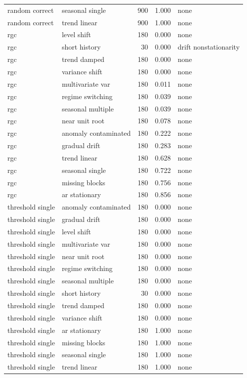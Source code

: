 \begin{tabular}{llrrl}
random correct & seasonal single & 900 & 1.000 & none \\
random correct & trend linear & 900 & 1.000 & none \\
rgc & level shift & 180 & 0.000 & none \\
rgc & short history & 30 & 0.000 & drift nonstationarity \\
rgc & trend damped & 180 & 0.000 & none \\
rgc & variance shift & 180 & 0.000 & none \\
rgc & multivariate var & 180 & 0.011 & none \\
rgc & regime switching & 180 & 0.039 & none \\
rgc & seasonal multiple & 180 & 0.039 & none \\
rgc & near unit root & 180 & 0.078 & none \\
rgc & anomaly contaminated & 180 & 0.222 & none \\
rgc & gradual drift & 180 & 0.283 & none \\
rgc & trend linear & 180 & 0.628 & none \\
rgc & seasonal single & 180 & 0.722 & none \\
rgc & missing blocks & 180 & 0.756 & none \\
rgc & ar stationary & 180 & 0.856 & none \\
threshold single & anomaly contaminated & 180 & 0.000 & none \\
threshold single & gradual drift & 180 & 0.000 & none \\
threshold single & level shift & 180 & 0.000 & none \\
threshold single & multivariate var & 180 & 0.000 & none \\
threshold single & near unit root & 180 & 0.000 & none \\
threshold single & regime switching & 180 & 0.000 & none \\
threshold single & seasonal multiple & 180 & 0.000 & none \\
threshold single & short history & 30 & 0.000 & none \\
threshold single & trend damped & 180 & 0.000 & none \\
threshold single & variance shift & 180 & 0.000 & none \\
threshold single & ar stationary & 180 & 1.000 & none \\
threshold single & missing blocks & 180 & 1.000 & none \\
threshold single & seasonal single & 180 & 1.000 & none \\
threshold single & trend linear & 180 & 1.000 & none \\
\bottomrule
\end{tabular}
